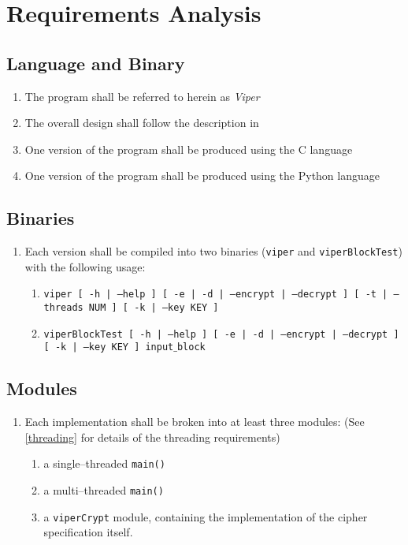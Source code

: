 \section{Requirements Analysis}

\subsection{Language and Binary}
\begin{enumerate}
\item The program shall be referred to herein as \emph{Viper}
\item The overall design shall follow the description in \cite{submission}
\item One version of the program shall be produced using the C language
\item One version of the program shall be produced using the Python language
\end{enumerate}

\subsection{Binaries}
\begin{enumerate}
\item Each version shall be compiled into two binaries (\texttt{viper} and \texttt{viperBlockTest}) with the following usage:
	\begin{enumerate}
	\item \texttt{viper [ -h | --help ]  [ -e | -d | --encrypt | --decrypt ] [ -t | --threads NUM ] [ -k | --key KEY ]}
	\item \texttt{viperBlockTest [ -h | --help ]  [ -e | -d | --encrypt | --decrypt ] [ -k | --key KEY ] input$\_$block}
	\end{enumerate}
\end{enumerate}

\subsection{Modules}
\begin{enumerate}
\item Each implementation shall be broken into at least three modules: (See \ref{threading} for details of the threading requirements)
	\begin{enumerate}
	\item a single--threaded \texttt{main()}
	\item a multi--threaded \texttt{main()}
	\item a \texttt{viperCrypt} module, containing the implementation of the cipher specification itself.
	\end{enumerate}
\end{enumerate}

